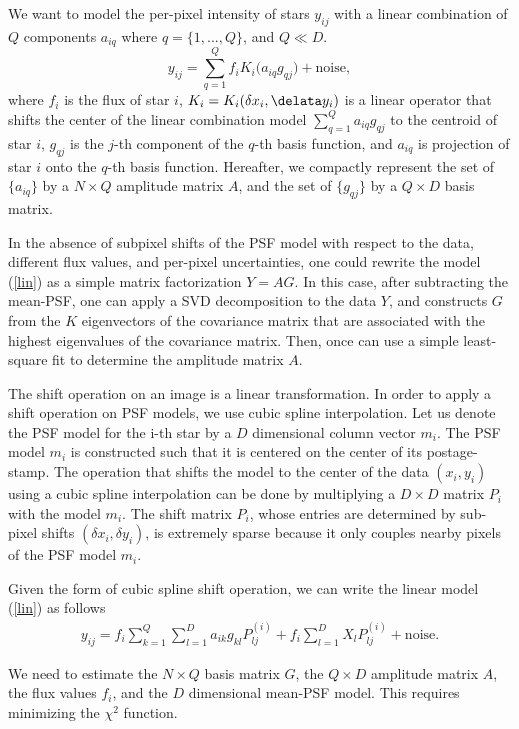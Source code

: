 \documentclass[12pt,preprint]{aastex}
\newcommand{\beq}{\begin{equation}}
\newcommand{\eeq}{\end{equation}}
\begin{document}
We want to model the per-pixel intensity of stars $y_{ij}$ with
a linear combination of $Q$ components $a_{iq}$ where $q=\{1,...,Q\}$, and $Q\ll D$.
\beq
y_{ij} = \sum_{q=1}^{Q} f_{i}K_{i}\big(a_{iq}g_{qj}\big) + \text{noise},
\label{lin}
\eeq
where $f_{i}$ is the flux of star $i$, $K_{i} = K_{i}(\delta x_{i} , \delata y_{i})$
is a linear operator that shifts the center of the linear 
combination model $\sum_{q=1}^{Q}a_{iq}g_{qj}$ to the centroid 
of star $i$, $g_{qj}$ is the $j$-th component of the $q$-th 
basis function, and $a_{iq}$ is projection
of star $i$ onto the $q$-th basis function. 
Hereafter, we compactly represent the set
of $\{a_{iq}\}$ by a $N\times Q$ amplitude matrix $A$, 
and the set of $\{g_{qj}\}$
by a $Q\times D$ basis matrix.

 In the absence of subpixel shifts of the PSF model
with respect to the data, different flux values, and per-pixel 
uncertainties, one could rewrite the model (\ref{lin}) as a 
simple matrix factorization $Y = AG$. In this case, after 
subtracting the mean-PSF, one can apply a SVD decomposition 
to the data $Y$, and constructs $G$ from the $K$ eigenvectors 
of the covariance matrix that are associated with the highest 
eigenvalues of the covariance matrix. Then, once can use a simple 
least-square fit to determine the amplitude matrix $A$. 

The shift operation on an image is a linear transformation. In order to
apply a shift operation on PSF models, we use cubic spline interpolation.
Let us denote the PSF model for the i-th star by a $D$ dimensional column 
vector $m_{i}$. The PSF model $m_{i}$ is constructed such that it is centered
on the center of its postage-stamp. The operation that shifts the model to the
center of the data $(x_{i} , y_{i})$ using a cubic spline interpolation can
be done by multiplying a $D\times D$ matrix $P_{i}$ with  the model $m_{i}$.
The shift matrix $P_{i}$, whose entries are determined by sub-pixel shifts $(\delta x_{i}
, \delta y_{i})$, is extremely sparse because it only couples nearby pixels of 
the PSF model $m_{i}$.

Given the form of cubic spline shift operation, we can write the linear model 
(\ref{lin}) as follows
\begin{eqnarray}
y_{ij} = f_{i} \sum_{k=1}^{Q}\sum_{l=1}^{D} a_{ik}g_{kl}P^{(i)}_{lj} +
         f_{i}\sum_{l=1}^{D} X_{l}P^{(i)}_{lj} + \text{noise}.
\end{eqnarray}

We need to estimate the $N\times Q$ basis matrix $G$, the $Q \times D$ amplitude 
matrix $A$, the flux values $f_{i}$, and the $D$ dimensional mean-PSF model.
This requires minimizing the $\chi^{2}$ function.
\end{document}
